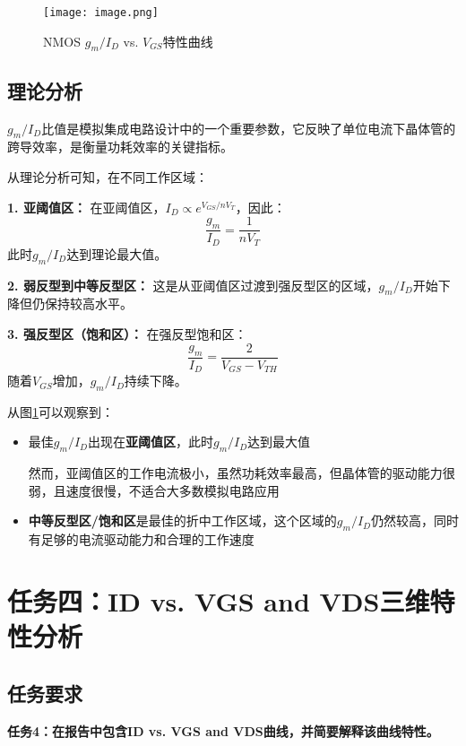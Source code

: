 \documentclass[UTF8,12pt,a4paper]{ctexart}
\begin{document}
\begin{figure}[h]
\centering
\texttt{[image: image.png]}
\caption{NMOS $g_m/I_D$ vs. $V_{GS}$特性曲线}
\label{fig:task3}
\end{figure}

\subsection{理论分析}
$g_m/I_D$比值是模拟集成电路设计中的一个重要参数，它反映了单位电流下晶体管的跨导效率，是衡量功耗效率的关键指标。

从理论分析可知，在不同工作区域：

\textbf{1. 亚阈值区：}
在亚阈值区，$I_D \propto e^{V_{GS}/nV_T}$，因此：
\begin{equation}
\frac{g_m}{I_D} = \frac{1}{nV_T} 
\end{equation}
此时$g_m/I_D$达到理论最大值。

\textbf{2. 弱反型到中等反型区：}
这是从亚阈值区过渡到强反型区的区域，$g_m/I_D$开始下降但仍保持较高水平。

\textbf{3. 强反型区（饱和区）：}
在强反型饱和区：
\begin{equation}
\frac{g_m}{I_D} = \frac{2}{V_{GS}-V_{TH}}
\end{equation}
随着$V_{GS}$增加，$g_m/I_D$持续下降。

从图\ref{fig:task3}可以观察到：
\begin{itemize}
  \item 最佳$g_m/I_D$出现在\textbf{亚阈值区}，此时$g_m/I_D$达到最大值

  然而，亚阈值区的工作电流极小，虽然功耗效率最高，但晶体管的驱动能力很弱，且速度很慢，不适合大多数模拟电路应用

  \item \textbf{中等反型区/饱和区}是最佳的折中工作区域，这个区域的$g_m/I_D$仍然较高，同时有足够的电流驱动能力和合理的工作速度
\end{itemize}

\newpage
\section{任务四：ID vs. VGS and VDS三维特性分析}

\subsection{任务要求}
\textbf{任务4：在报告中包含ID vs. VGS and VDS曲线，并简要解释该曲线特性。}
\end{document}
